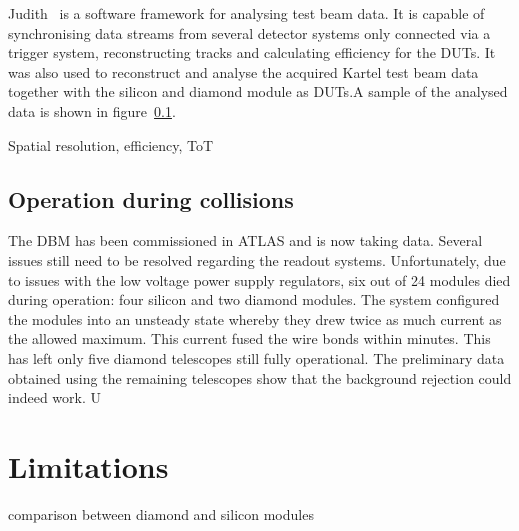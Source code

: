\documentclass[12pt]{packages/mytustyle}  %
\begin{document}
Judith~\cite{} is a software framework for analysing test beam data. It is capable of synchronising data streams from several detector systems only connected via a trigger system, reconstructing tracks and calculating efficiency for the DUTs. It was also used to reconstruct and analyse the acquired Kartel test beam data together with the silicon and diamond module as DUTs.A sample of the analysed data is shown in figure~\ref{}. 

Spatial resolution, efficiency, ToT


\subsection{Operation during collisions}
The DBM has been commissioned in ATLAS and is now taking data. Several issues still need to be resolved regarding the readout systems. Unfortunately, due to issues with the low voltage power supply regulators, six out of 24 modules died during operation: four silicon and two diamond modules. The system configured the modules into an unsteady state whereby they drew twice as much current as the allowed maximum. This current fused the wire bonds within minutes. This has left only five diamond telescopes still fully operational. The preliminary data obtained using the remaining telescopes show that the background rejection could indeed work. U






\section{Limitations}
\label{sec:limitations}

comparison between diamond and silicon modules

\end{document}
